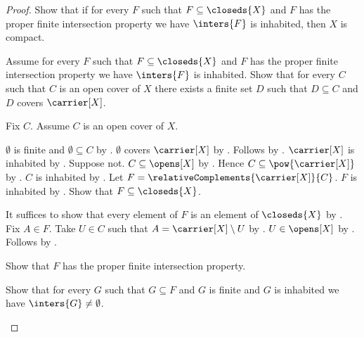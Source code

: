 \begin{proof}
    Show that if for every $F$ such that $F\subseteq\closeds{X}$ and
        $F$ has the proper finite intersection property we have
        $\inters{F}$ is inhabited, then $X$ is compact.
    \begin{subproof}
        Assume for every $F$ such that $F\subseteq\closeds{X}$ and
            $F$ has the proper finite intersection property we have
            $\inters{F}$ is inhabited.
        Show that for every $C$ such that $C$ is an open cover of $X$
            there exists a finite set $D$ such that $D\subseteq C$ and
            $D$ covers $\carrier[X]$.
        \begin{subproof}
            Fix $C$.
            Assume $C$ is an open cover of $X$.
            \begin{byCase}
                $\emptyset$ is finite and $\emptyset\subseteq C$
                    by .
                $\emptyset$ covers $\carrier[X]$ by .
                Follows by \auto.
                $\carrier[X]$ is inhabited by .
                Suppose not.
                $C\subseteq\opens[X]$ by .
                Hence $C\subseteq\pow{\carrier[X]}$
                    by .
                $C$ is inhabited by .
                Let $F=\relativeComplements{\carrier[X]}{C}$.
                $F$ is inhabited by .
                Show that $F\subseteq\closeds{X}$.
                \begin{subproof}
                    It suffices to show that every element of $F$ is an
                        element of $\closeds{X}$ by .
                    Fix $A\in F$.
                    Take $U\in C$ such that
                        $A=\carrier[X]\setminus U$
                        by .
                    $U\in\opens[X]$ by .
                    Follows by .
                \end{subproof}
                Show that $F$ has the proper finite intersection property.
                \begin{subproof}
                    Show that for every $G$ such that $G\subseteq F$ and
                        $G$ is finite and $G$ is inhabited we have
                        $\inters{G}\neq\emptyset$.
                    \begin{subproof}

\end{subproof}
\end{subproof}
\end{byCase}
\end{subproof}
\end{subproof}
\end{proof}
